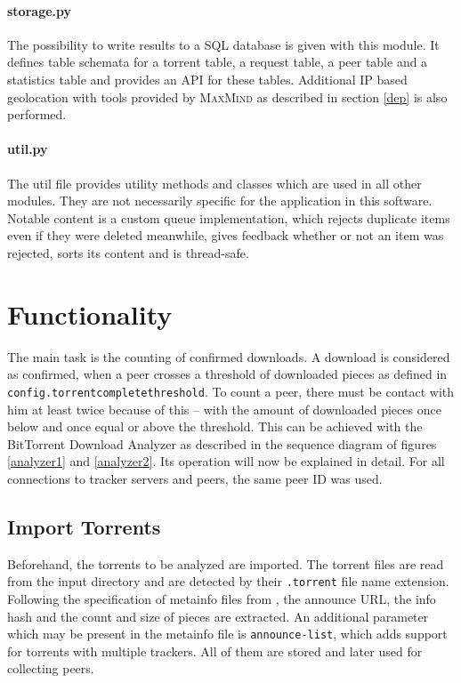 \documentclass[10pt, a4paper, twoside=false, headsepline]{scrbook}
\renewcommand{\_}{\origunderscore\allowbreak}
\newcommand{\config}[1]{\texttt{config.\allowbreak #1}}
\begin{document}
\paragraph{storage.py} The possibility to write results to a SQL database is given with this module. It defines table schemata for a torrent table, a request table, a peer table and a statistics table and provides an API for these tables. Additional IP based geolocation with tools provided by \textsc{MaxMind} as described in section \ref{dep} is also performed.

\paragraph{util.py} The util file provides utility methods and classes which are used in all other modules. They are not necessarily specific for the application in this software. Notable content is a custom queue implementation, which rejects duplicate items even if they were deleted meanwhile, gives feedback whether or not an item was rejected, sorts its content and is thread-safe.

\section{Functionality}
\label{func}
The main task is the counting of confirmed downloads. A download is considered as confirmed, when a peer crosses a threshold of downloaded pieces as defined in \config{torrent\_complete\_threshold}. To count a peer, there must be contact with him at least twice because of this -- with the amount of downloaded pieces once below and once equal or above the threshold. This can be achieved with the BitTorrent Download Analyzer as described in the sequence diagram of figures \ref{analyzer1} and \ref{analyzer2}. Its operation will now be explained in detail. For all connections to tracker servers and peers, the same peer ID was used.

\subsection{Import Torrents}
Beforehand, the torrents to be analyzed are imported. The torrent files are read from the input directory and are detected by their \texttt{.torrent} file name extension. Following the specification of metainfo files from \cite{bep3}, the announce URL, the info hash and the count and size of pieces are extracted. An additional parameter which may be present in the metainfo file is \texttt{announce-list}, which adds support for torrents with multiple trackers. All of them are stored and later used for collecting peers.
\end{document}
